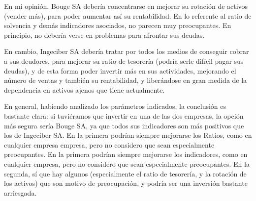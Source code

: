 \documentclass[a4paper]{article}
\begin{document}
En mi opinión, Bouge SA debería concentrarse en mejorar su rotación de activos (vender más), para poder aumentar así su rentabilidad. En lo referente al ratio de solvencia y demás indicadores asociados, no parecen muy preocupantes. En principio, no debería verse en problemas para afrontar sus deudas.

En cambio, Ingeciber SA debería tratar por todos los medios de conseguir cobrar a sus deudores, para mejorar su ratio de tesorería (podría serle difícil pagar sus deudas), y de esta forma poder invertir más en sus actividades, mejorando el número de ventas y también su rentabilidad, y liberándose en gran medida de la dependencia en activos ajenos que tiene actualmente.

En general, habiendo analizado los parámetros indicados, la conclusión es bastante clara: si tuviéramos que invertir en una de las dos empresas, la opción más segura sería Bouge SA, ya que todos sus indicadores son más positivos que los de Ingeciber SA. En la primera podrían siempre mejorarse los Ratios, como en cualquier empresa empresa, pero no considero que sean especialmente preocupantes. En la primera podrían siempre mejorarse los indicadores, como en cualquier empresa, pero no considero que sean especialmente preocupantes. En la segunda, sí que hay algunos (especialmente el ratio de tesorería, y la rotación de los activos) que son motivo de preocupación, y podría ser una inversión bastante arriesgada.
\end{document}
